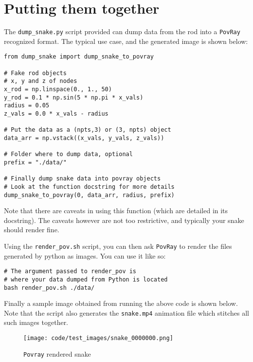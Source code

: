 \documentclass[11pt]{article}
\begin{document}
\section{Putting them together}
\label{sec:org973d6fb}
The \texttt{dump\_snake.py} script provided can dump data from the rod into a \texttt{PovRay}
recognized format. The typical use case, and the generated image is shown
below:
\begin{verbatim}
from dump_snake import dump_snake_to_povray

# Fake rod objects
# x, y and z of nodes
x_rod = np.linspace(0., 1., 50)
y_rod = 0.1 * np.sin(5 * np.pi * x_vals)
radius = 0.05
z_vals = 0.0 * x_vals - radius

# Put the data as a (npts,3) or (3, npts) object
data_arr = np.vstack((x_vals, y_vals, z_vals))

# Folder where to dump data, optional
prefix = "./data/"

# Finally dump snake data into povray objects
# Look at the function docstring for more details
dump_snake_to_povray(0, data_arr, radius, prefix)
\end{verbatim}
Note that there are caveats in using this function (which are detailed in its
docstring). The caveats however are not too restrictive, and typically your
snake should render fine.

Using the \texttt{render\_pov.sh} script, you can then ask \texttt{PovRay} to render the
files generated by python as images. You can use it like so:

\begin{verbatim}
# The argument passed to render_pov is
# where your data dumped from Python is located
bash render_pov.sh ./data/
\end{verbatim}

Finally a sample image obtained from running the above code is shown below.
Note that the script also generates the \texttt{snake.mp4} animation file which
stitches all such images together.

\begin{figure}[htbp]
\centering
\texttt{[image: code/test\_images/snake\_0000000.png]}
\caption{\texttt{Povray} rendered snake}
\end{figure}
\end{document}
